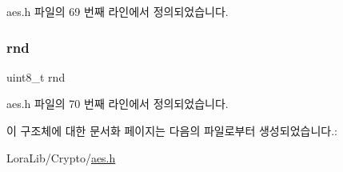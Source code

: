 aes.\+h 파일의 69 번째 라인에서 정의되었습니다.

\mbox{\label{structaes__context_ad1a4ecf3125fbcc9447f70f7361f2fb0}} 
\subsubsection{\texorpdfstring{rnd}{rnd}}
{\footnotesize\ttfamily uint8\+\_\+t rnd}



aes.\+h 파일의 70 번째 라인에서 정의되었습니다.



이 구조체에 대한 문서화 페이지는 다음의 파일로부터 생성되었습니다.\+:\begin{DoxyCompactItemize}
\item 
Lora\+Lib/\+Crypto/\mbox{\hyperlink{aes_8h}{aes.\+h}}\end{DoxyCompactItemize}
